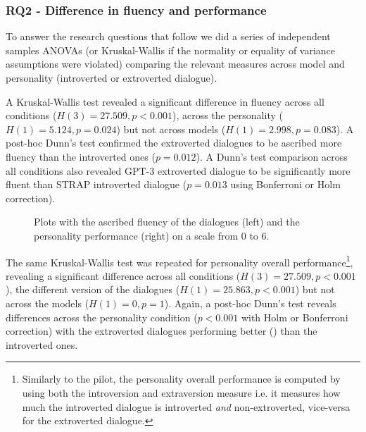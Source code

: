 \documentclass[nomenclature, english, biblatex]{kththesis}
\begin{document}
\subsubsection{RQ2 - Difference in fluency and performance}
To answer the research questions that follow we did a series of independent samples \glspl{ANOVA} (or Kruskal-Wallis if the normality or equality of variance assumptions were violated) comparing the relevant measures across model and personality (introverted or extroverted dialogue).

A Kruskal-Wallis test revealed a significant difference in fluency across all conditions ($H(3)=27.509, p<0.001$), across the personality ($H(1)=5.124, p=0.024$) but not across models ($H(1)=2.998, p=0.083$). A post-hoc Dunn's test confirmed the extroverted dialogues to be ascribed more fluency than the introverted ones ($p=0.012$). %
A Dunn's test comparison across all conditions also revealed GPT-3 extroverted dialogue to be significantly more fluent than STRAP introverted dialogue ($p=0.013$ using Bonferroni or Holm correction).

\begin{figure}[ht]
    \centering
    \begin{adjustbox}{max width=\textwidth}
        \begin{adjustbox}{max width=0.5\textwidth}
            
        \end{adjustbox}
        \begin{adjustbox}{max width=0.5\textwidth}
             
        \end{adjustbox}
    \end{adjustbox}
    \caption{Plots with the ascribed fluency of the dialogues (left) and the personality performance (right) on a scale from 0 to 6.}
    \label{fig:study_rq2}
\end{figure}
The same Kruskal-Wallis test was repeated for personality overall performance\footnote{Similarly to the pilot, the personality overall performance is computed by using both the introversion and extraversion measure i.e. it measures how much the introverted dialogue is introverted \textit{and} non-extroverted, vice-versa for the extroverted dialogue.}, revealing a significant difference across all conditions ($H(3)=27.509, p<0.001$), the different version of the dialogues ($H(1)=25.863,p<0.001$) but not across the models ($H(1)=0, p=1$). Again, a post-hoc Dunn's test reveals differences across the personality condition ($p<0.001$ with Holm or Bonferroni correction) with the extroverted dialogues performing better () than the introverted ones.
\end{document}
